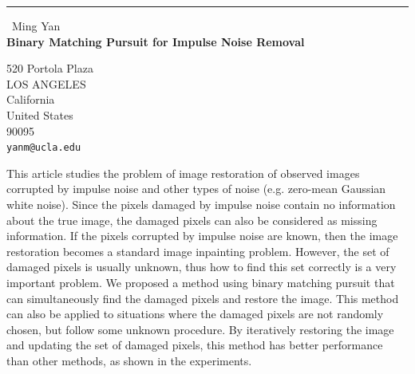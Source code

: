 \documentclass{report}
\begin{document}
\begin{center}
\rule{6in}{1pt} \
{\large Ming Yan \\
{\bf Binary Matching Pursuit for Impulse Noise Removal}}

520 Portola Plaza \\ LOS ANGELES \\ California \\ United States \\ 90095
\\
{\tt yanm@ucla.edu}\end{center}

This article studies the problem of image restoration of observed images
corrupted by impulse noise and other types of noise (e.g. zero-mean
Gaussian white noise). Since the pixels damaged by impulse noise contain
no information about the true image, the damaged pixels can also be
considered as missing information. If the pixels corrupted by impulse
noise are known, then the image restoration becomes a standard image
inpainting problem. However, the set of damaged pixels is usually
unknown, thus how to find this set correctly is a very important problem.
We proposed a method using binary matching pursuit that can
simultaneously find the damaged pixels and restore the image. This method
can also be applied to situations where the damaged pixels are not
randomly chosen, but follow some unknown procedure. By iteratively
restoring the image and updating the set of damaged pixels, this method
has better performance than other methods, as shown in the experiments.
\end{document}
